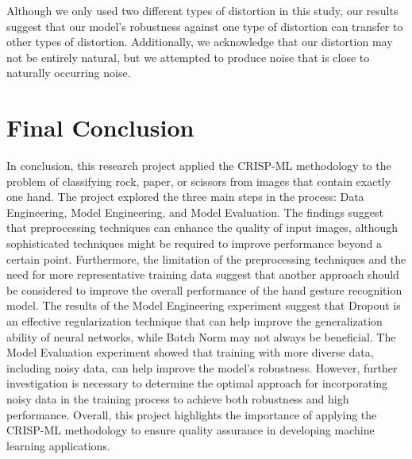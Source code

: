 \documentclass[a4paper]{article}
\begin{document}
Although we only used two different types of distortion in this study, our results suggest that our model's robustness against one type of distortion can transfer to other types of distortion. Additionally, we acknowledge that our distortion may not be entirely natural, but we attempted to produce noise that is close to naturally occurring noise.


\section{Final Conclusion}

In conclusion, this research project applied the CRISP-ML methodology to the problem of classifying rock, paper, or scissors from images that contain exactly one hand. The project explored the three main steps in the process: Data Engineering, Model Engineering, and Model Evaluation. 
The findings suggest that preprocessing techniques can enhance the quality of input images, although sophisticated techniques might be required to improve performance beyond a certain point. Furthermore, the limitation of the preprocessing techniques and the need for more representative training data suggest that another approach should be considered to improve the overall performance of the hand gesture recognition model. 
The results of the Model Engineering experiment suggest that Dropout is an effective regularization technique that can help improve the generalization ability of neural networks, while Batch Norm may not always be beneficial. 
The Model Evaluation experiment showed that training with more diverse data, including noisy data, can help improve the model's robustness. However, further investigation is necessary to determine the optimal approach for incorporating noisy data in the training process to achieve both robustness and high performance. Overall, this project highlights the importance of applying the CRISP-ML methodology to ensure quality assurance in developing machine learning applications.

\newpage






\end{document}
